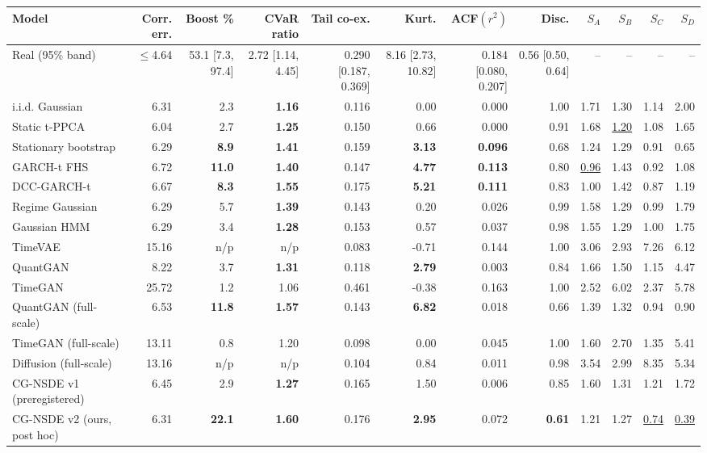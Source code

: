 \begin{tabular}{lrrrrrrrrrrr}
\toprule
Model & Corr. err. & Boost \% & CVaR ratio & Tail co-ex. & Kurt. & ACF$(r^2)$ & Disc. & $S_A$ & $S_B$ & $S_C$ & $S_D$ \\
\midrule
Real (95\% band) & $\le$4.64 & 53.1 [7.3, 97.4] & 2.72 [1.14, 4.45] & 0.290 [0.187, 0.369] & 8.16 [2.73, 10.82] & 0.184 [0.080, 0.207] & 0.56 [0.50, 0.64] & -- & -- & -- & -- \\
\midrule
i.i.d. Gaussian & 6.31 & 2.3 & \textbf{1.16} & 0.116 & 0.00 & 0.000 & 1.00 & 1.71 & 1.30 & 1.14 & 2.00 \\
Static t-PPCA & 6.04 & 2.7 & \textbf{1.25} & 0.150 & 0.66 & 0.000 & 0.91 & 1.68 & \underline{1.20} & 1.08 & 1.65 \\
Stationary bootstrap & 6.29 & \textbf{8.9} & \textbf{1.41} & 0.159 & \textbf{3.13} & \textbf{0.096} & 0.68 & 1.24 & 1.29 & 0.91 & 0.65 \\
GARCH-t FHS & 6.72 & \textbf{11.0} & \textbf{1.40} & 0.147 & \textbf{4.77} & \textbf{0.113} & 0.80 & \underline{0.96} & 1.43 & 0.92 & 1.08 \\
DCC-GARCH-t & 6.67 & \textbf{8.3} & \textbf{1.55} & 0.175 & \textbf{5.21} & \textbf{0.111} & 0.83 & 1.00 & 1.42 & 0.87 & 1.19 \\
Regime Gaussian & 6.29 & 5.7 & \textbf{1.39} & 0.143 & 0.20 & 0.026 & 0.99 & 1.58 & 1.29 & 0.99 & 1.79 \\
Gaussian HMM & 6.29 & 3.4 & \textbf{1.28} & 0.153 & 0.57 & 0.037 & 0.98 & 1.55 & 1.29 & 1.00 & 1.75 \\
TimeVAE & 15.16 & n/p & n/p & 0.083 & -0.71 & 0.144 & 1.00 & 3.06 & 2.93 & 7.26 & 6.12 \\
QuantGAN & 8.22 & 3.7 & \textbf{1.31} & 0.118 & \textbf{2.79} & 0.003 & 0.84 & 1.66 & 1.50 & 1.15 & 4.47 \\
TimeGAN & 25.72 & 1.2 & 1.06 & 0.461 & -0.38 & 0.163 & 1.00 & 2.52 & 6.02 & 2.37 & 5.78 \\
QuantGAN (full-scale) & 6.53 & \textbf{11.8} & \textbf{1.57} & 0.143 & \textbf{6.82} & 0.018 & 0.66 & 1.39 & 1.32 & 0.94 & 0.90 \\
TimeGAN (full-scale) & 13.11 & 0.8 & 1.20 & 0.098 & 0.00 & 0.045 & 1.00 & 1.60 & 2.70 & 1.35 & 5.41 \\
Diffusion (full-scale) & 13.16 & n/p & n/p & 0.104 & 0.84 & 0.011 & 0.98 & 3.54 & 2.99 & 8.35 & 5.34 \\
CG-NSDE v1 (preregistered) & 6.45 & 2.9 & \textbf{1.27} & 0.165 & 1.50 & 0.006 & 0.85 & 1.60 & 1.31 & 1.21 & 1.72 \\
CG-NSDE v2 (ours, post hoc) & 6.31 & \textbf{22.1} & \textbf{1.60} & 0.176 & \textbf{2.95} & 0.072 & \textbf{0.61} & 1.21 & 1.27 & \underline{0.74} & \underline{0.39} \\
\bottomrule
\end{tabular}
